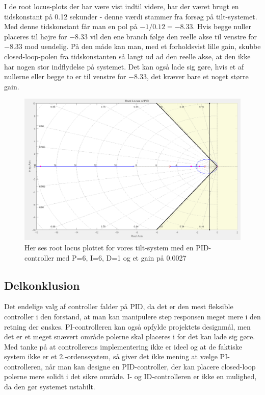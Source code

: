 I de root locus-plots der har være vist indtil videre, har der været brugt en tidskonstant på 0.12 sekunder - denne værdi stammer fra forsøg på tilt-systemet. Med denne tidskonstant får man en pol på $-1/0.12=-8.33$. Hvis begge nuller placeres til højre for $-8.33$ vil den ene branch følge den reelle akse til venstre for $-8.33$ mod uendelig. På den måde kan man, med et forholdsvist lille gain, skubbe closed-loop-polen fra tidskonstanten så langt ud ad den reelle akse, at den ikke har nogen stor indflydelse på systemet. Det kan også lade sig gøre, hvis et af nullerne eller begge to er til venstre for $-8.33$, det kræver bare et noget større gain.

\begin{figure}[ht]
	\begin{center}
		\includegraphics[scale=0.45]{Billeder/PID_rlocus.PNG}
	\end{center}
\caption{Her ses root locus plottet for vores tilt-system med en PID-controller med P=6, I=6, D=1 og et gain på 0.0027}
\label{fig:PID_rlocus}
\end{figure}

\subsection{Delkonklusion}

Det endelige valg af controller falder på PID, da det er den mest fleksible controller i den forstand, at man kan manipulere step responsen meget mere i den retning der ønskes. PI-controlleren kan også opfylde projektets designmål, men det er et meget snævert område polerne skal placeres i for det kan lade sig gøre. Med tanke på at controllerens implementering ikke er ideel og at de faktiske system ikke er et 2.-ordenssystem, så giver det ikke mening at vælge PI-controlleren, når man kan designe en PID-controller, der kan placere closed-loop polerne mere solidt i det sikre område. I- og ID-controlleren er ikke en mulighed, da den gør systemet ustabilt.